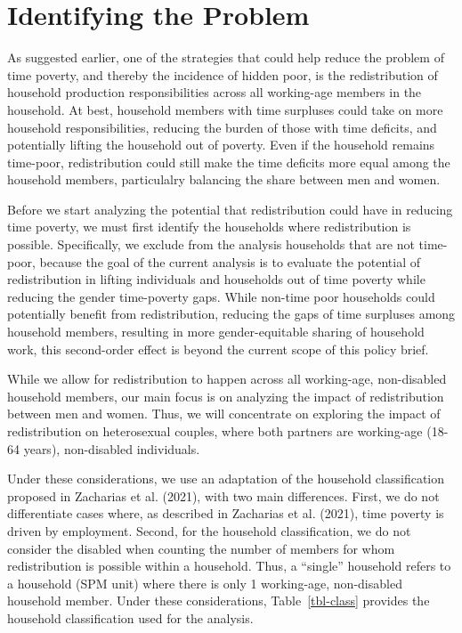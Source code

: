 \documentclass[
  11pt,
]{article}
\begin{document}
\section{Identifying the Problem}\label{sec-problem}

As suggested earlier, one of the strategies that could help reduce the
problem of time poverty, and thereby the incidence of hidden poor, is
the redistribution of household production responsibilities across all
working-age members in the household. At best, household members with
time surpluses could take on more household responsibilities, reducing
the burden of those with time deficits, and potentially lifting the
household out of poverty. Even if the household remains time-poor,
redistribution could still make the time deficits more equal among the
household members, particulalry balancing the share between men and
women.

Before we start analyzing the potential that redistribution could have
in reducing time poverty, we must first identify the households where
redistribution is possible. Specifically, we exclude from the analysis
households that are not time-poor, because the goal of the current
analysis is to evaluate the potential of redistribution in lifting
individuals and households out of time poverty while reducing the gender
time-poverty gaps. While non-time poor households could potentially
benefit from redistribution, reducing the gaps of time surpluses among
household members, resulting in more gender-equitable sharing of
household work, this second-order effect is beyond the current scope of
this policy brief.

While we allow for redistribution to happen across all working-age,
non-disabled household members, our main focus is on analyzing the
impact of redistribution between men and women. Thus, we will
concentrate on exploring the impact of redistribution on heterosexual
couples, where both partners are working-age (18-64 years), non-disabled
individuals.

Under these considerations, we use an adaptation of the household
classification proposed in Zacharias et al. (2021), with two main
differences. First, we do not differentiate cases where, as described in
Zacharias et al. (2021), time poverty is driven by employment. Second,
for the household classification, we do not consider the disabled when
counting the number of members for whom redistribution is possible
within a household. Thus, a ``single'' household refers to a household
(SPM unit) where there is only 1 working-age, non-disabled household
member. Under these considerations, Table~\ref{tbl-class} provides the
household classification used for the analysis.
\end{document}
